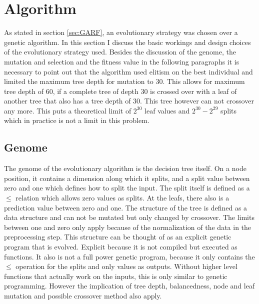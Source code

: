 \documentclass[conference]{IEEEtran}
\begin{document}

\section{Algorithm}
As stated in section \ref{sec:GARF}, an evolutionary strategy was chosen over a genetic algorithm. In this section I discuss the basic workings and design choices of the evolutionary strategy used. Besides the discussion of the genome, the mutation and selection and the fitness value in the following paragraphs it is necessary to point out that the algorithm used elitism on the best individual and limited the maximum tree depth for mutation to 30. This allows for maximum tree depth of 60, if a complete tree of depth 30 is crossed over with a leaf of another tree that also has a tree depth of 30. This tree however can not crossover any more.
This puts a theoretical limit of $2^{30}$ leaf values and $2^{30} - 2^{29}$ splits which in practice is not a limit in this problem.
%

\subsection{Genome}
The genome of the evolutionary algorithm is the decision tree itself.
On a node position, it contains a dimension along which it splits, and a split value between zero and one which defines how to split the input. The split itself is defined as a $\leq$ relation which allows zero values as splits. 
At the leafs, there also is a prediction value between zero and one. The structure of the tree is defined as a data structure and can not be mutated but only changed by crossover. The limits between one and zero only apply because of the normalization of the data in the preprocessing step.
This structure can be thought of as an explicit genetic program that is evolved. Explicit because it is not compiled but executed as functions. It also is not a full power genetic program, because it only contains the $\leq$ operation for the splits and only values as outputs. Without higher level functions that actually work on the inputs, this is only similar to genetic programming. However the implication of tree depth, balancedness, node and leaf mutation and possible crossover method also apply.
\end{document}
